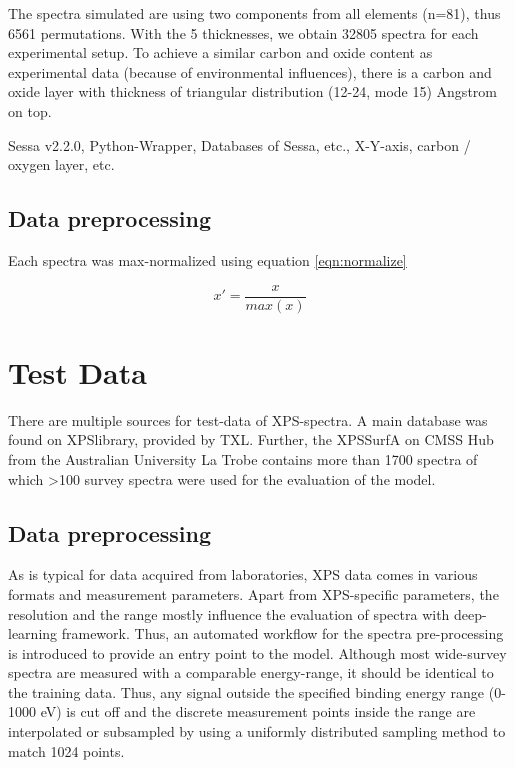 The spectra simulated are using two components from all elements (n=81), thus 6561 permutations. With the 5 thicknesses, we obtain 32805 spectra for each experimental setup. To achieve a similar carbon and oxide content as experimental data (because of environmental influences), there is a carbon and oxide layer with thickness of triangular distribution (12-24, mode 15) Angstrom on top. 


Sessa v2.2.0, Python-Wrapper, Databases of Sessa, etc., X-Y-axis, carbon / oxygen layer, etc.


\subsection{Data preprocessing}

Each spectra was max-normalized using equation \ref{eqn:normalize} 

\begin{equation}
    x' = \frac{x}{max(x)}
\label{eqn:normalize}
\end{equation}


\section{Test Data}

There are multiple sources for test-data of XPS-spectra. A main database was found on XPSlibrary, provided by TXL. Further, the XPSSurfA on CMSS Hub from the Australian University La Trobe contains more than 1700 spectra of which >100 survey spectra were used for the evaluation of the model.


\subsection{Data preprocessing}

As is typical for data acquired from laboratories, XPS data comes in various formats and measurement parameters. Apart from XPS-specific parameters, the resolution and the range mostly influence the evaluation of spectra with deep-learning framework. Thus, an automated workflow for the spectra pre-processing is introduced to provide an entry point to the model.
Although most wide-survey spectra are measured with a comparable energy-range, it should be identical to the training data. Thus, any signal outside the specified binding energy range (0-1000 eV) is cut off and the discrete measurement points inside the range are interpolated or subsampled by using a uniformly distributed sampling method to match 1024 points. 